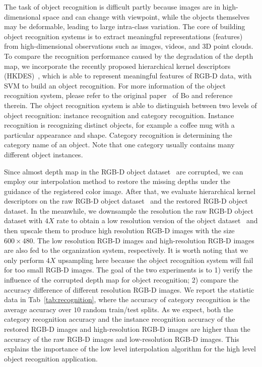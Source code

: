 \documentclass[preprint,10pt,5p,times,twocolumn]{elsarticle}
\begin{document}
The task of object recognition is difficult partly because images are in high-dimensional space and can change with viewpoint, while the objects themselves may be deformable, leading to large intra-class variation. The core of building object recognition systems is to extract meaningful representations (features) from high-dimensional observations such as images, videos, and 3D point clouds. To compare the recognition performance caused by the degradation of the depth map, we incorporate the recently proposed hierarchical kernel descriptors (HKDES)~\cite{Bo_CVPR_2011}, which is able to represent meaningful features of RGB-D data, with SVM to build an object recognition. For more information of the object recognition system, please refer to the original paper~\cite{Bo_CVPR_2011} of Bo and reference therein. The object recognition system is able to distinguish between two levels of object recognition: instance recognition and category recognition. Instance recognition is recognizing distinct objects, for example a coffee mug with a particular appearance and shape. Category recognition is determining the category name of an object. Note that one category usually contains many different object instances.

Since almost depth map in the RGB-D object dataset~\cite{Lai_ICRA_2011} are corrupted, we can employ our interpolation method to restore the missing depths under the guidance of the registered color image. After that, we evaluate hierarchical kernel descriptors on the raw RGB-D object dataset~\cite{Bo_CVPR_2011} and the restored RGB-D object dataset. In the meanwhile, we downsample the resolution the raw RGB-D object dataset with $4X$ rate to obtain a low resolution version of the object dataset~\cite{Bo_CVPR_2011} and then upscale them to produce high resolution RGB-D images with the size $600 \times 480$. The low resolution RGB-D images and high-resolution RGB-D images are also fed to the organization system, respectively. It is worth noting that we only perform $4X$ upsampling here because the object recognition system will fail for too small RGB-D images. The goal of the two experiments is to 1) verify the influence of the corrupted depth map for object recognition; 2) compare the accuracy difference of different resolution RGB-D images. We report the statistic data in Tab~\ref{tab:recognition}, where the accuracy of category recognition is the average accuracy over $10$ random train/test splits.  As we expect, both the category recognition accuracy and the instance recognition accuracy of the restored RGB-D images and high-resolution RGB-D images are higher than the accuracy of the raw RGB-D images and low-resolution RGB-D images. This explains the importance of the low level interpolation algorithm for the high level object recognition application.
\end{document}
